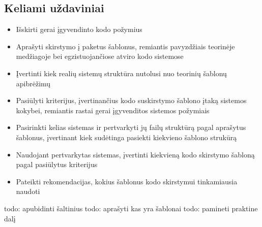 \subsection{Keliami uždaviniai}
\begin{itemize}
    \item Išskirti gerai įgyvendinto kodo požymius
    \item  Aprašyti skirstymo į paketus šablonus, remiantis pavyzdžiais teorinėje medžiagoje bei
egzistuojančiose atviro kodo sistemose
    \item  Įvertinti kiek realių sistemų struktūra nutolusi nuo teorinių šablonų apibrėžimų
    \item  Pasiūlyti kriterijus, įvertinančius kodo suskirstymo šablono įtaką sistemos kokybei, remiantis
rastai gerai įgyvenditos sistemos požymiais
    \item  Pasirinkti kelias sistemas ir pertvarkyti jų failų struktūrą pagal aprašytus šablonus, įvertinant
kiek sudėtinga pasiekti kiekvieno šablono strukūrą
    \item  Naudojant pertvarkytas sistemas, įvertinti kiekvieną kodo skirstymo šabloną pagal pasiūlytus kriterijus
    \item  Pateikti rekomendacijas, kokius šablonus kodo skirstymui tinkamiausia naudoti
\end{itemize}
todo: apubidinti šaltinius
todo: aprašyti kas yra šablonai
todo: pamineti praktine dalį

